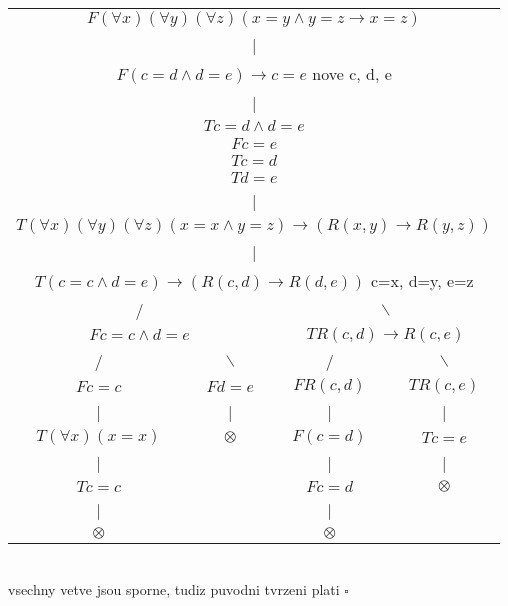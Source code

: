 \documentclass[a4paper]{article}
\begin{document}
\begin{tabular}{ c c c c }
    \multicolumn{4}{c}{$F(\forall x)(\forall y)(\forall z)(x=y \wedge y=z \rightarrow x=z)$} \\
    \multicolumn{4}{c}{|} \\
    \multicolumn{4}{c}{$F(c=d \wedge d=e) \rightarrow c=e$ nove c, d, e} \\
    \multicolumn{4}{c}{|} \\
    \multicolumn{4}{c}{$T c=d \wedge d=e$}\\
    \multicolumn{4}{c}{$F c=e$}\\
    \multicolumn{4}{c}{$T c=d$}\\
    \multicolumn{4}{c}{$T d=e$}\\
    \multicolumn{4}{c}{|} \\
    \multicolumn{4}{c}{$T(\forall x)(\forall y)(\forall z)(x=x \wedge y=z)\rightarrow(R(x,y)\rightarrow R(y,z))$}\\
    \multicolumn{4}{c}{|} \\
    \multicolumn{4}{c}{$T(c=c \wedge d=e) \rightarrow (R(c,d) \rightarrow R(d,e))$ c=x, d=y, e=z}\\ 
    \multicolumn{2}{c}{/} & \multicolumn{2}{c}{$\backslash$} \\
    \multicolumn{2}{c}{$F c=c \wedge d=e$} & \multicolumn{2}{c}{$T R(c,d) \rightarrow R(c,e)$} \\
    / & $\backslash$ & / & $\backslash$ \\
    $F c=c$ & $F d=e$ & $FR(c,d)$ & $TR(c,e)$  \\ 
    | & | & | & | \\
    $T(\forall x)(x=x)$ & $\otimes$ &  $F(c=d)$ & $T c=e$ \\  
    | &  & | & | \\
    $T c=c$ &  & $F c=d$ & $\otimes$ \\
    | &  & | &  \\
    $\otimes$ &  & $\otimes$ &     
\end{tabular}
\\
vsechny vetve jsou sporne, tudiz puvodni tvrzeni plati $\square$
\end{document}

